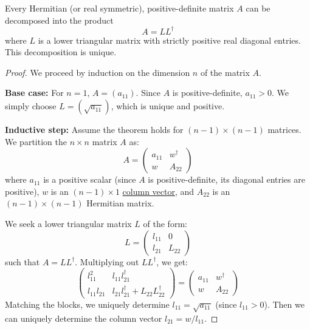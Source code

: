   \begin{definition}
    \label{def:cholesky-decomposition}
    Every Hermitian (or real symmetric), positive-definite matrix $A$ can be decomposed into the product
    \begin{equation}
      A = L L^\dagger
    \end{equation}
    where $L$ is a lower triangular matrix with strictly positive real diagonal entries. This decomposition is unique.
  \end{definition}
  \begin{proof}
    We proceed by induction on the dimension $n$ of the matrix $A$. 
    
    \textbf{Base case:} For $n=1$, $A = (a_{11})$. Since $A$ is positive-definite, $a_{11} > 0$. We simply choose $L = (\sqrt{a_{11}})$, which is unique and positive. 
    
    \textbf{Inductive step:} Assume the theorem holds for $(n-1) \times (n-1)$ matrices. We partition the $n \times n$ matrix $A$ as:
    \begin{equation}
      A = \begin{pmatrix} a_{11} & w^\dagger \\ w & A_{22} \end{pmatrix}
    \end{equation}
    where $a_{11}$ is a positive scalar (since $A$ is positive-definite, its diagonal entries are positive), $w$ is an $(n-1) \times 1$ \hyperref[def:column-vector]{column vector}, and $A_{22}$ is an $(n-1) \times (n-1)$ Hermitian matrix. 
    
    We seek a lower triangular matrix $L$ of the form:
    \begin{equation}
      L = \begin{pmatrix} l_{11} & 0 \\ l_{21} & L_{22} \end{pmatrix}
    \end{equation}
    such that $A = L L^\dagger$. Multiplying out $L L^\dagger$, we get:
    \begin{equation}
      \begin{pmatrix} l_{11}^2 & l_{11} l_{21}^\dagger \\ l_{11} l_{21} & l_{21} l_{21}^\dagger + L_{22} L_{22}^\dagger \end{pmatrix} = \begin{pmatrix} a_{11} & w^\dagger \\ w & A_{22} \end{pmatrix}
    \end{equation}
    Matching the blocks, we uniquely determine $l_{11} = \sqrt{a_{11}}$ (since $l_{11} > 0$). Then we can uniquely determine the column vector $l_{21} = w / l_{11}$. 
    

\end{proof}
